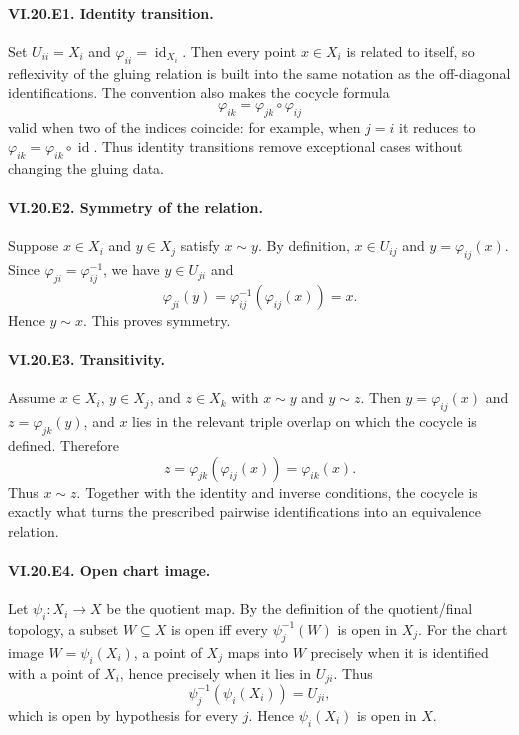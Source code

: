 
\paragraph{VI.20.E1. Identity transition.}
\begin{solution}
Set $U_{ii}=X_i$ and $\varphi_{ii}=\operatorname{id}_{X_i}$.  Then every point $x\in X_i$ is related to itself, so reflexivity of the gluing relation is built into the same notation as the off-diagonal identifications.  The convention also makes the cocycle formula
\[
\varphi_{ik}=\varphi_{jk}\circ\varphi_{ij}
\]
valid when two of the indices coincide: for example, when $j=i$ it reduces to $\varphi_{ik}=\varphi_{ik}\circ\operatorname{id}$.  Thus identity transitions remove exceptional cases without changing the gluing data.
\end{solution}

\paragraph{VI.20.E2. Symmetry of the relation.}
\begin{solution}
Suppose $x\in X_i$ and $y\in X_j$ satisfy $x\sim y$.  By definition, $x\in U_{ij}$ and $y=\varphi_{ij}(x)$.  Since $\varphi_{ji}=\varphi_{ij}^{-1}$, we have $y\in U_{ji}$ and
\[
\varphi_{ji}(y)=\varphi_{ij}^{-1}(\varphi_{ij}(x))=x.
\]
Hence $y\sim x$.  This proves symmetry.
\end{solution}

\paragraph{VI.20.E3. Transitivity.}
\begin{solution}
Assume $x\in X_i$, $y\in X_j$, and $z\in X_k$ with $x\sim y$ and $y\sim z$.  Then
$y=\varphi_{ij}(x)$ and $z=\varphi_{jk}(y)$, and $x$ lies in the relevant triple overlap on which the cocycle is defined.  Therefore
\[
z=\varphi_{jk}(\varphi_{ij}(x))=\varphi_{ik}(x).
\]
Thus $x\sim z$.  Together with the identity and inverse conditions, the cocycle is exactly what turns the prescribed pairwise identifications into an equivalence relation.
\end{solution}

\paragraph{VI.20.E4. Open chart image.}
\begin{solution}
Let $\psi_i:X_i\to X$ be the quotient map.  By the definition of the quotient/final topology, a subset $W\subseteq X$ is open iff every $\psi_j^{-1}(W)$ is open in $X_j$.  For the chart image $W=\psi_i(X_i)$, a point of $X_j$ maps into $W$ precisely when it is identified with a point of $X_i$, hence precisely when it lies in $U_{ji}$.  Thus
\[
\psi_j^{-1}(\psi_i(X_i))=U_{ji},
\]
which is open by hypothesis for every $j$.  Hence $\psi_i(X_i)$ is open in $X$.
\end{solution}

